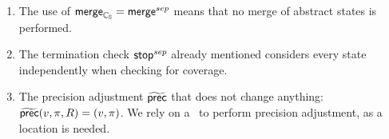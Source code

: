 \begin{enumerate}[leftmargin=*, label=\arabic*.]
\item The use of $\operatorname{\operatorname{\mathsf{merge}}}_{\mathbb{C_{S}}} = \operatorname{\operatorname{\mathsf{merge}}}^{sep}$ means that no merge of abstract states is performed.
\item The termination check $\operatorname{\operatorname{\mathsf{stop}}}^{sep}$ already mentioned considers every state independently when checking for coverage.

\item
The precision adjustment $\operatorname{\widetilde{\operatorname{\operatorname{\mathsf{prec}}}}}$ that does not change anything: $\operatorname{\widetilde{\operatorname{\operatorname{\mathsf{prec}}}}}(v, \pi, R) = (v, \pi)$. We rely on a \compositeCPA\ to perform precision adjustment, as a location is needed.

\end{enumerate}

